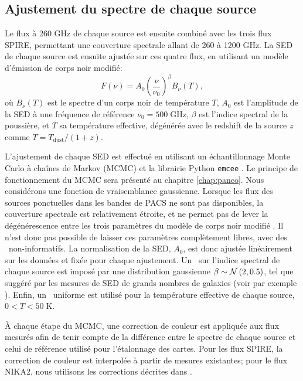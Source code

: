\subsection{Ajustement du spectre de chaque source}

Le flux à 260 GHz de chaque source est ensuite combiné avec les trois flux SPIRE, permettant une couverture spectrale allant de 260 à 1200 GHz.
La SED de chaque source est ensuite ajustée sur ces quatre flux, en utilisant un modèle d'émission de corps noir modifié:
\begin{equation}
    F(\nu) = A_0 \left(\frac{\nu}{\nu_0}\right)^\beta B_\nu(T),
    \label{eq:pstools:sed}
\end{equation}
où $B_\nu(T)$ est le spectre d'un corps noir de température $T$, $A_0$ est l'amplitude de la SED à une fréquence de référence $\nu_0 = 500 \; \mathrm{GHz}$, $\beta$ est l'indice spectral de la poussière, et $T$ sa température effective, dégénérée avec le redshift de la source $z$ comme $T = T_\mathrm{dust} / (1+z)$.

L'ajustement de chaque SED est effectué en utilisant un échantillonnage Monte Carlo à chaînes de Markov (MCMC) et la librairie Python \texttt{emcee} \cite{foreman-mackey_emcee_2019}.
Le principe de fonctionnement du MCMC sera présenté au chapitre \ref{chap:panco}.
Nous considérons une fonction de vraisemblance gaussienne.
Lorsque les flux des sources ponctuelles dans les bandes de PACS ne sont pas disponibles, la couverture spectrale est relativement étroite, et ne permet pas de lever la dégénérescence entre les trois paramètres du modèle de corps noir modifié \cite{desert_submillimetre_2008,magnelli_herschel_2012,smith_isothermal_2013}.
Il n'est donc pas possible de laisser ces paramètres complètement libres, avec des \prior\ non-informatifs.
La normalisation de la SED, $A_0$, est donc ajustée linéairement sur les données et fixée pour chaque ajustement.
Un \prior\ sur l'indice spectral de chaque source est imposé par une distribution gaussienne $\beta \sim \mathcal{N}\,(2, 0.5)$, tel que suggéré par les mesures de SED de grands nombres de galaxies (voir par exemple \cite{magnelli_herschel_2012}).
Enfin, un \prior\ uniforme est utilisé pour la température effective de chaque source, $0 < T < 50 \; \mathrm{K}$.

À chaque étape du MCMC, une correction de couleur est appliquée aux flux mesurés afin de tenir compte de la différence entre le spectre de chaque source et celui de référence utilisé pour l'étalonnage des cartes.
Pour les flux SPIRE, la correction de couleur est interpolée \`a partir de mesures existantes\footnotemark ; pour le flux NIKA2, nous utilisons les corrections décrites dans \cite{perotto_calibration_2020}.

